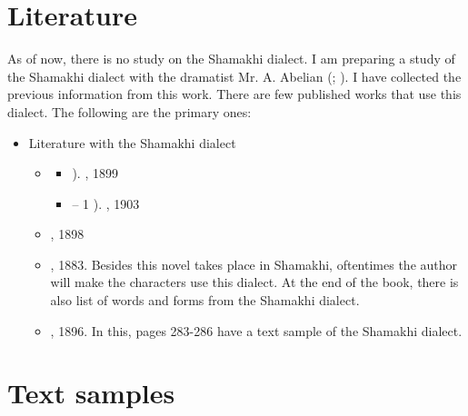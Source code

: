 \begin{adjarianpage}\label{page:80}\end{adjarianpage}%

\section{Literature}

As of now, there is no study on the Shamakhi dialect. I am preparing a study of the Shamakhi dialect with the dramatist Mr. A. Abelian (; ). I have collected the previous information from this work. There are few published works that use this dialect. The following are the primary ones:


{\litoverview}

\begin{itemize}
	\item Literature with the Shamakhi dialect
	\begin{itemize}
		\item {} 
		\begin{itemize}
			\item {}). , 1899
			\item –  1 ). , 1903
		\end{itemize}
		\item {}, 1898
		\item {}, 1883. Besides this novel takes place in Shamakhi, oftentimes the author will make the characters use this dialect. At the end of the book, there is also list of words and forms from the Shamakhi dialect. 
		\item {}, 1896. In this, pages 283-286 have a text sample of the Shamakhi dialect. 
		
	\end{itemize}
\end{itemize}

\section{Text samples}

